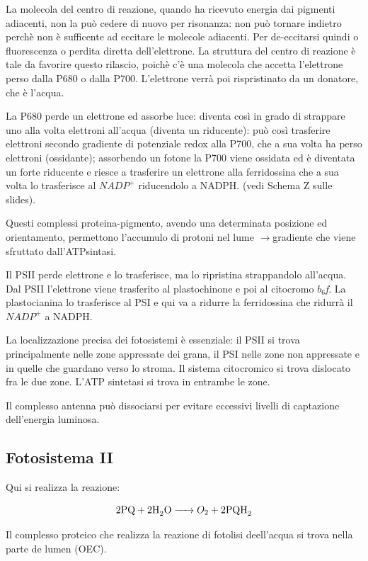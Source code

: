 \documentclass[a4paper,12pt]{book}
\newcommand{\lfreccia}{\ensuremath{\longrightarrow}}
\begin{document}
La molecola del centro di reazione, quando ha ricevuto energia dai pigmenti adiacenti, non la può cedere di nuovo per risonanza: non può tornare indietro perchè non è sufficente ad eccitare le molecole adiacenti. Per de-eccitarsi quindi o fluorescenza o perdita diretta dell'elettrone. 
La struttura del centro di reazione è tale da favorire questo rilascio, poichè c'è una molecola che accetta l'elettrone perso dalla P680 o dalla P700. L'elettrone verrà poi rispristinato da un donatore, che è l'acqua. 

La P680 perde un elettrone ed assorbe luce: diventa così in grado di strappare uno alla volta elettroni all'acqua (diventa un riducente): può così trasferire elettroni secondo gradiente di potenziale redox alla P700, che a sua volta ha perso elettroni (ossidante); assorbendo un fotone la P700 viene ossidata ed è diventata un forte riducente e riesce a trasferire un elettrone alla ferridossina che a sua volta lo trasferisce al $NADP^{+}$ riducendolo a NADPH. (vedi Schema Z sulle slides). 

Questi complessi proteina-pigmento, avendo una determinata posizione ed orientamento, permettono l'accumulo di protoni nel lume \lfreccia gradiente che viene sfruttato dall'ATPsintasi. 

Il PSII perde elettrone e lo trasferisce, ma lo ripristina strappandolo all'acqua. Dal PSII l'elettrone viene trasferito al plastochinone e poi al citocromo \emph{$b_{6}$f}. La plastocianina lo trasferisce al PSI e qui va a ridurre la ferridossina che ridurrà il $NADP^{+}$ a NADPH.

La localizzazione precisa dei fotosistemi è essenziale: il PSII si trova principalmente nelle zone appressate dei grana, il PSI nelle zone non appressate e in quelle che guardano verso lo stroma. Il sistema citocromico si trova dislocato fra le due zone. L'ATP sintetasi si trova in entrambe le zone.

Il complesso antenna può dissociarsi per evitare eccessivi livelli di captazione dell'energia luminosa.

\subsection{Fotosistema II}
Qui si realizza la reazione:

\begin{equation}
\ce{2 PQ + 2 H2O -> $O_{2}$ + 2 PQH2}
\end{equation}


Il complesso proteico che realizza la reazione di fotolisi deell'acqua si trova nella parte de lumen (OEC).
\end{document}
